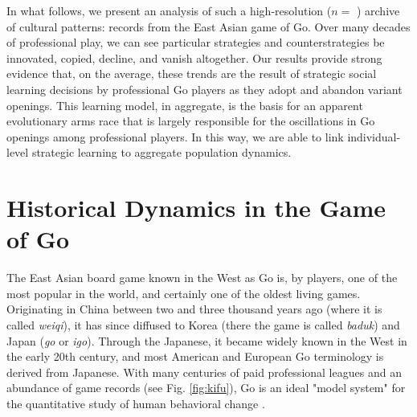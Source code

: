 \documentclass[reqno,12pt]{amsart}
\begin{document}
In what follows, we present an analysis of such a high-resolution ($n=$ \nGames) archive of cultural patterns: records from the East Asian game of Go. Over many decades of professional play, we can see particular strategies and counterstrategies be innovated, copied, decline, and vanish altogether. Our results provide strong evidence that, on the average, these trends are the result of strategic social learning decisions by professional Go players as they adopt and abandon variant openings. This learning model, in aggregate, is the basis for an apparent evolutionary arms race that is largely responsible for the oscillations in Go openings among professional players. In this way, we are able to link individual-level strategic learning to aggregate population dynamics.

\section{Historical Dynamics in the Game of Go}

The East Asian board game known in the West as Go is, by players, one of the most popular in the world, and certainly one of the oldest living games. Originating in China between two and three thousand years ago (where it is called \textit{weiqi}), it has since diffused to Korea (there the game is called \textit{baduk}) and Japan (\textit{go} or \textit{igo}). Through the Japanese, it became widely known in the West in the early 20th century, and most American and European Go terminology is derived from Japanese. With many centuries of paid professional leagues and an abundance of game records (see Fig. \ref{fig:kifu}), Go is an ideal "model system" for the quantitative study of human behavioral change \citep{gobet2004moves}.
\end{document}
